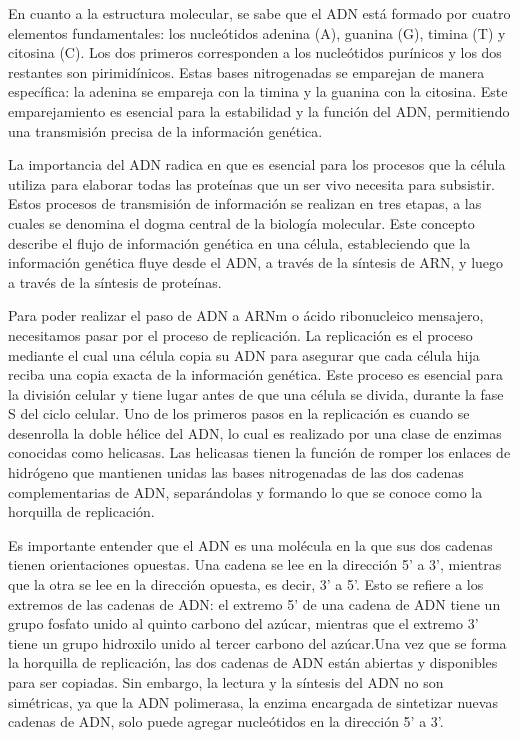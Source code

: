 \documentclass[12pt]{article}
\begin{document}
En cuanto a la estructura molecular, se sabe que el ADN está formado por cuatro elementos fundamentales: los nucleótidos adenina (A), guanina (G), timina (T) y citosina (C). Los dos primeros corresponden a los nucleótidos purínicos y los dos restantes son pirimidínicos. Estas bases nitrogenadas se emparejan de manera específica: la adenina se empareja con la timina y la guanina con la citosina. Este emparejamiento es esencial para la estabilidad y la función del ADN, permitiendo una transmisión precisa de la información genética.

La importancia del ADN radica en que es esencial para los procesos que la célula utiliza para elaborar todas las proteínas que un ser vivo necesita para subsistir. Estos procesos de transmisión de información se realizan en tres etapas, a las cuales se denomina el dogma central de la biología molecular. Este concepto describe el flujo de información genética en una célula, estableciendo que la información genética fluye desde el ADN, a través de la síntesis de ARN, y luego a través de la síntesis de proteínas.

Para poder realizar el paso de ADN a ARNm o ácido ribonucleico mensajero, necesitamos pasar por el proceso de replicación. La replicación es el proceso mediante el cual una célula copia su ADN para asegurar que cada célula hija reciba una copia exacta de la información genética. Este proceso es esencial para la división celular y tiene lugar antes de que una célula se divida, durante la fase S del ciclo celular. Uno de los primeros pasos en la replicación es cuando se desenrolla la doble hélice del ADN, lo cual es realizado por una clase de enzimas conocidas como helicasas. Las helicasas tienen la función de romper los enlaces de hidrógeno que mantienen unidas las bases nitrogenadas de las dos cadenas complementarias de ADN, separándolas y formando lo que se conoce como la horquilla de replicación.

Es importante entender que el ADN es una molécula en la que sus dos cadenas tienen orientaciones opuestas. Una cadena se lee en la dirección 5' a 3', mientras que la otra se lee en la dirección opuesta, es decir, 3' a 5'. Esto se refiere a los extremos de las cadenas de ADN: el extremo 5' de una cadena de ADN tiene un grupo fosfato unido al quinto carbono del azúcar, mientras que el extremo 3' tiene un grupo hidroxilo unido al tercer carbono del azúcar.Una vez que se forma la horquilla de replicación, las dos cadenas de ADN están abiertas y disponibles para ser copiadas. Sin embargo, la lectura y la síntesis del ADN no son simétricas, ya que la ADN polimerasa, la enzima encargada de sintetizar nuevas cadenas de ADN, solo puede agregar nucleótidos en la dirección 5' a 3'.
\end{document}

